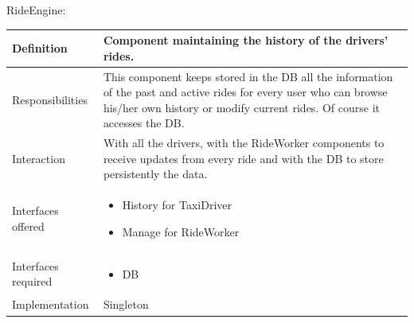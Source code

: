 \documentclass[a4paper,11pt]{report} %
\begin{document}
	\pagebreak
	\vspace*{-0.35cm}
	\centerline{RideEngine:}
	\begin{center}
		\begin{tabular}{| l | p{9cm} |}\hline
			Definition & Component maintaining the history of the drivers' rides.\\\hline
			Responsibilities & This component keeps stored in the DB all the information of the past and active rides for every user who can browse his/her own history or modify current rides. Of course it accesses the DB.\\\hline
			Interaction & With all the drivers, with the RideWorker components to receive updates from every ride and with the DB to store persistently the data.\\\hline
			Interfaces offered & \begin{itemize}
				\item History for TaxiDriver
				\item Manage for RideWorker
			\end{itemize}\\\hline
			Interfaces required & \begin{itemize}
				\item DB
			\end{itemize}\\\hline
			Implementation & Singleton\\\hline
		\end{tabular}
	\end{center}		
	
\end{document}
